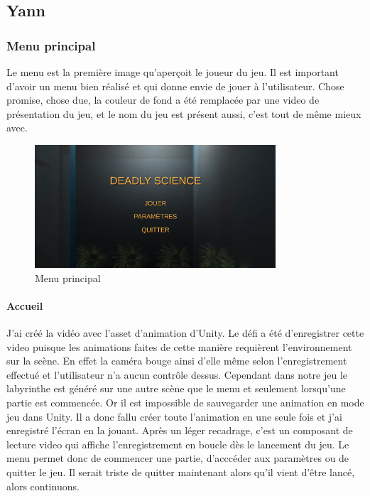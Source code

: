 \documentclass{article}
\begin{document}
\subsection{Yann}
\subsubsection{Menu principal}

Le menu est la première image qu'aperçoit le joueur du jeu. Il est important d'avoir un menu bien réalisé et qui donne envie de jouer à l'utilisateur. Chose promise, chose due, la couleur de fond a été remplacée par une video de présentation du jeu, et le nom du jeu est présent aussi, c'est tout de même mieux avec.

\begin{figure}[!h]
	\centering
	\includegraphics[width=0.8\textwidth]{MainMenu.png}
	\caption{Menu principal}
	\label{Menu principal}
\end{figure}

\paragraph{Accueil}
J'ai créé la vidéo avec l'asset d'animation d'Unity. Le défi a été d'enregistrer cette video puisque les animations faites de cette manière requièrent l'environnement sur la scène. En effet la caméra bouge ainsi d'elle même selon l'enregistrement effectué et l'utilisateur n'a aucun contrôle dessus. Cependant dans notre jeu le labyrinthe est généré sur une autre scène que le menu et seulement lorsqu'une partie est commencée. Or il est impossible de sauvegarder une animation en mode jeu dans Unity. Il a donc fallu créer toute l'animation en une seule fois et j'ai enregistré l'écran en la jouant. Après un léger recadrage, c'est un composant de lecture video qui affiche l'enregistrement en boucle dès le lancement du jeu.
\newline
Le menu permet donc de commencer une partie, d'acccéder aux paramètres ou de quitter le jeu. Il serait triste de quitter maintenant alors qu'il vient d'être lancé, alors continuons.
\end{document}

